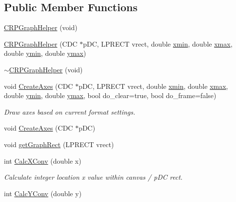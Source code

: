 \subsection*{Public Member Functions}
\begin{DoxyCompactItemize}
\item 
\hyperlink{classCRPGraphHelper_a8408d1c4ef2c5616ab522caf953c051f}{CRPGraphHelper} (void)
\item 
\hyperlink{classCRPGraphHelper_a26175e5bc9c8b7bd8ddf025c636538f0}{CRPGraphHelper} (CDC $\ast$pDC, LPRECT vrect, double \hyperlink{classCRPGraphHelper_a4b377d8449a20dbc52568755c436dd04}{xmin}, double \hyperlink{classCRPGraphHelper_afdf2e086315615df102cf9778e96f1a9}{xmax}, double \hyperlink{classCRPGraphHelper_a6abfda58e3ec46c62d4416116519a529}{ymin}, double \hyperlink{classCRPGraphHelper_acc153e73a250d824d7be26eb8596fbe0}{ymax})
\item 
\hyperlink{classCRPGraphHelper_a7954eeddbe0931d91eaf2f8edca32237}{$\sim$CRPGraphHelper} (void)
\item 
void \hyperlink{classCRPGraphHelper_aedad5cc20c9e04bbf8be65ed99c0272c}{CreateAxes} (CDC $\ast$pDC, LPRECT vrect, double \hyperlink{classCRPGraphHelper_a4b377d8449a20dbc52568755c436dd04}{xmin}, double \hyperlink{classCRPGraphHelper_afdf2e086315615df102cf9778e96f1a9}{xmax}, double \hyperlink{classCRPGraphHelper_a6abfda58e3ec46c62d4416116519a529}{ymin}, double \hyperlink{classCRPGraphHelper_acc153e73a250d824d7be26eb8596fbe0}{ymax}, bool do\_\-clear=true, bool do\_\-frame=false)
\begin{DoxyCompactList}\small\item\em Draw axes based on current format settings. \item\end{DoxyCompactList}\item 
void \hyperlink{classCRPGraphHelper_a765c4517050afb6c7a4f26c78e8dc01b}{CreateAxes} (CDC $\ast$pDC)
\item 
void \hyperlink{classCRPGraphHelper_ad69d21dabc90e015d067721fb3dbb6ac}{getGraphRect} (LPRECT vrect)
\item 
int \hyperlink{classCRPGraphHelper_a45028d702dade23e30a36fc329ccba8d}{CalcXConv} (double x)
\begin{DoxyCompactList}\small\item\em Calculate integer location x value within canvas / pDC rect. \item\end{DoxyCompactList}\item 
int \hyperlink{classCRPGraphHelper_a1b50320aa5f6c246ffc6611c1e5c1a5e}{CalcYConv} (double y)

\end{DoxyCompactItemize}

